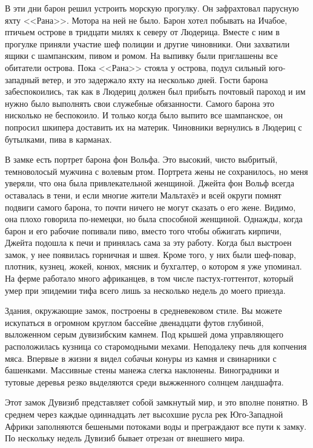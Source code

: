 \documentclass[12pt,a4paper,twoside,openany,svgnames]{memoir}
\begin{document}
В эти дни барон решил устроить морскую прогулку. Он зафрахтовал парусную яхту <<Рана>>. Мотора на ней не было. Барон хотел побывать на Ичабое, птичьем острове в тридцати милях к северу от Людерица. Вместе с ним в прогулке приняли участие шеф полиции и другие чиновники. Они захватили ящики с шампанским, пивом и ромом. На выпивку были приглашены все обитатели острова. Пока <<Рана>> стояла у острова, подул сильный юго-западный ветер, и это задержало яхту на несколько дней. Гости барона забеспокоились, так как в Людериц должен был прибыть почтовый пароход и им нужно было выполнять свои служебные обязанности. Самого барона это нисколько не беспокоило. И только когда было выпито все шампанское, он попросил шкипера доставить их на материк. Чиновники вернулись в Людериц с бутылками, пива в карманах.

В замке есть портрет барона фон Вольфа. Это высокий, чисто выбритый, темноволосый мужчина с волевым ртом. Портрета жены не сохранилось, но меня уверяли, что она была привлекательной женщиной. Джейта фон Вольф всегда оставалась в тени, и если многие жители Мальтахёэ и всей округи помнят подвиги самого барона, то почти ничего не могут сказать о его жене. Видимо, она плохо говорила по-немецки, но была способной женщиной. Однажды, когда барон и его рабочие попивали пиво, вместо того чтобы обжигать кирпичи, Джейта подошла к печи и принялась сама за эту работу. Когда был выстроен замок, у нее появилась горничная и швея. Кроме того, у них были шеф-повар, плотник, кузнец, жокей, конюх, мясник и бухгалтер, о котором я уже упоминал. На ферме работало много африканцев, в том числе пастух-готтентот, который умер при эпидемии тифа всего лишь за несколько недель до моего приезда.

Здания, окружающие замок, построены в средневековом стиле. Вы можете искупаться в огромном круглом бассейне двенадцати футов глубиной, выложенном серым дувизибским камнем. Под крышей дома управляющего расположилась кузница со старомодными мехами. Неподалеку печь для копчения мяса. Впервые в жизни я видел собачьи конуры из камня и свинарники с башенками. Массивные стены манежа слегка наклонены. Виноградники и тутовые деревья резко выделяются среди выжженного солнцем ландшафта.

Этот замок Дувизиб представляет собой замкнутый мир, и это вполне понятно. В среднем через каждые одиннадцать лет высохшие русла рек Юго-Западной Африки заполняются бешеными потоками воды и преграждают все пути к замку. По нескольку недель Дувизиб бывает отрезан от внешнего мира.
\end{document}
